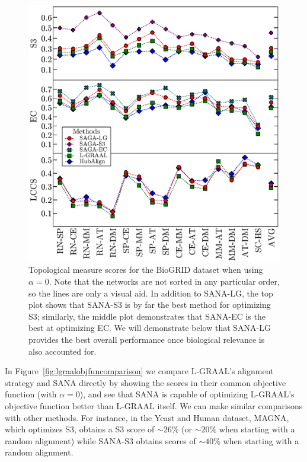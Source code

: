 \documentclass{bioinfo}
\begin{document}
\begin{figure}
\centering
\includegraphics[width=0.99\linewidth]{biogrid_alpha0_bw.eps}
\caption{Topological measure scores for the BioGRID dataset when using $\alpha=0$. Note that the networks are not sorted in any particular order, so the lines are only a visual aid. In addition to SANA-LG, the top plot shows that SANA-S3 is by far the best method for optimizing S3; similarly, the middle plot demonstrates that SANA-EC is the best at optimizing EC. We will demonstrate below that SANA-LG provides the best overall performance once biological relevance is also accounted for.}
\label{fig:biogrid_alpha0}
\end{figure}

In Figure~\ref{fig:lgraalobjfuncomparison} we compare L-GRAAL's alignment strategy and SANA directly by showing the scores in their common objective function (with $\alpha=0$), and see that SANA is capable of optimizing L-GRAAL's objective function better than L-GRAAL itself. We can make similar comparisons with other methods. For instance, in the Yeast and Human dataset, MAGNA, which optimizes S3, obtains a S3 score of ${\sim}26\%$ (or ${\sim}20\%$ when starting with a random alignment) while SANA-S3 obtains scores of ${\sim}40\%$ when starting with a random alignment.
\end{document}
